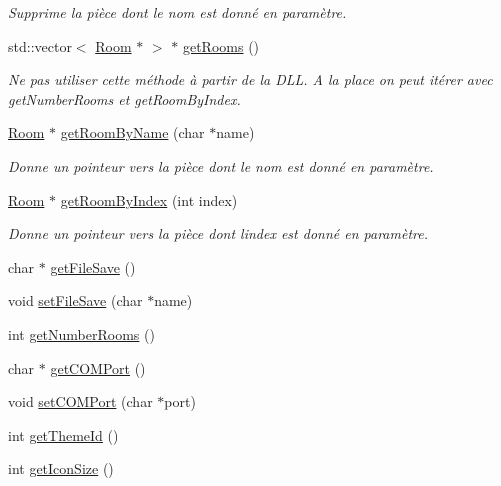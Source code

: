 \begin{DoxyCompactItemize}
\begin{DoxyCompactList}\small\item\em Supprime la pièce dont le nom est donné en paramètre. \end{DoxyCompactList}\item 
std\+::vector$<$ \hyperlink{class_e_p_1_1_room}{Room} $\ast$ $>$ $\ast$ \hyperlink{class_e_p_1_1_core_abbb72fd01eaa6e77f3fff6a4fe9f21c7}{get\+Rooms} ()
\begin{DoxyCompactList}\small\item\em Ne pas utiliser cette méthode à partir de la D\+LL. A la place on peut itérer avec get\+Number\+Rooms et get\+Room\+By\+Index. \end{DoxyCompactList}\item 
\hyperlink{class_e_p_1_1_room}{Room} $\ast$ \hyperlink{class_e_p_1_1_core_a4b4c84d507fe183c130faf32f345b0e1}{get\+Room\+By\+Name} (char $\ast$name)
\begin{DoxyCompactList}\small\item\em Donne un pointeur vers la pièce dont le nom est donné en paramètre. \end{DoxyCompactList}\item 
\hyperlink{class_e_p_1_1_room}{Room} $\ast$ \hyperlink{class_e_p_1_1_core_a0914409b3e2d84fd68a6898cca18ffc6}{get\+Room\+By\+Index} (int index)
\begin{DoxyCompactList}\small\item\em Donne un pointeur vers la pièce dont l\textquotesingle{}index est donné en paramètre. \end{DoxyCompactList}\item 
char $\ast$ \hyperlink{class_e_p_1_1_core_ad05dbd7220eed607ba316128c9ec7f3a}{get\+File\+Save} ()
\item 
void \hyperlink{class_e_p_1_1_core_a6af6b833aa08aa2d733f9b9590722d8c}{set\+File\+Save} (char $\ast$name)
\item 
int \hyperlink{class_e_p_1_1_core_a9fc190b88c92ee9844c59f840c3d8040}{get\+Number\+Rooms} ()
\item 
char $\ast$ \hyperlink{class_e_p_1_1_core_a5962fad30852b23d5bfcb5737b92f51a}{get\+C\+O\+M\+Port} ()
\item 
void \hyperlink{class_e_p_1_1_core_a9d1b1a45758cfd8ef092673bc28da5c7}{set\+C\+O\+M\+Port} (char $\ast$port)
\item 
int \hyperlink{class_e_p_1_1_core_adb173042f0f6b4c3a5682d3d0830fb55}{get\+Theme\+Id} ()
\item 
int \hyperlink{class_e_p_1_1_core_ab87c0abca00a328cc8a49e44f167867d}{get\+Icon\+Size} ()

\end{DoxyCompactItemize}
